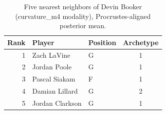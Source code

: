 \begin{table}[htbp]
  \centering\small
  \begin{tabular}{rllc}
    \toprule
    Rank & Player & Position & Archetype \\
    \midrule
    1 & Zach LaVine & G & 1 \\
    2 & Jordan Poole & G & 1 \\
    3 & Pascal Siakam & F & 1 \\
    4 & Damian Lillard & G & 2 \\
    5 & Jordan Clarkson & G & 1 \\
    \bottomrule
  \end{tabular}
  \caption{Five nearest neighbors of Devin Booker (curvature_m4 modality), Procrustes-aligned posterior mean.}
  \label{tab:Devin_Booker_neighbors_curvature_m4}
\end{table}

